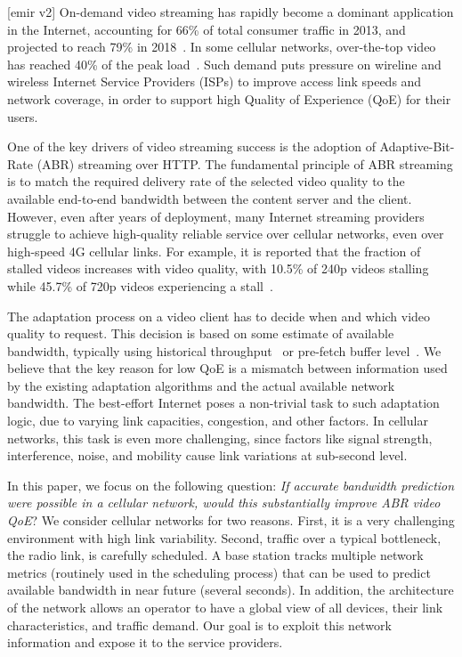 [emir v2]
On-demand video streaming has rapidly become a dominant application in the Internet, accounting for 66\% of total consumer traffic in 2013, and projected to reach 79\% in 2018~\cite{cisco-vni}. In some cellular networks, over-the-top video has reached 40\% of the peak load~\cite{Erman:IMC:2011}. Such demand puts pressure on wireline and wireless Internet Service Providers (ISPs) to improve access link speeds and network coverage, in order to support high Quality of Experience (QoE) for their users.

One of the key drivers of video streaming success is the adoption of Adaptive-Bit-Rate (ABR) streaming over HTTP. The fundamental principle of ABR streaming is to match the required delivery rate of the selected video quality to the available end-to-end bandwidth between the content server and the client. However, even after years of deployment, many Internet streaming providers struggle to achieve high-quality reliable service over cellular networks, even over high-speed 4G cellular links. For example, it is reported that the fraction of stalled videos increases with video quality, with 10.5\% of 240p videos stalling while 45.7\% of 720p videos experiencing a stall~\cite{citrix-stall}. 

The adaptation process on a video client has to decide when and which video quality to request. This decision is based on some estimate of available bandwidth, typically using historical throughput~\cite{QDASH,Festive} or pre-fetch buffer level~\cite{BBA}. We believe that the key reason for low QoE is a mismatch between information used by the existing adaptation algorithms and the actual available network bandwidth. The best-effort Internet poses a non-trivial task to such adaptation logic, due to varying link capacities, congestion, and other factors. In cellular networks, this task is even more challenging, 
since factors like signal strength, interference, noise, and mobility cause link variations at sub-second level.

In this paper, we focus on the following question: \emph{If accurate bandwidth prediction were possible in a cellular network, would this substantially improve ABR video QoE}? We consider cellular networks for two reasons. First, it is a very challenging environment with high link variability. Second, traffic over a typical bottleneck, the radio link, is carefully scheduled. A base station tracks multiple network metrics (routinely used in the scheduling process) that can be used to predict available bandwidth in near future (several seconds). In addition, the architecture of the network allows an operator to have a global view of all devices, their link characteristics, and traffic demand. Our goal is to exploit this network information and expose it to the service providers.

